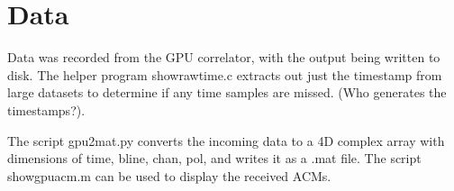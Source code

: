 \documentclass {article}
\begin{document}
\section {Data}
Data was recorded from the GPU correlator, with the output being written to
disk. The helper program showrawtime.c extracts out just the timestamp from
large datasets to determine if any time samples are missed. (Who generates the
timestamps?). 


The script gpu2mat.py converts the incoming data to a 4D complex array with dimensions
of time, bline, chan, pol, and writes it as a .mat file. The script
showgpuacm.m can be used to display the received ACMs.


\begin{figure}[tbh]
\end{figure}
\end{document}
